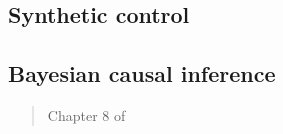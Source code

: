 \documentclass[12pt]{article}
\begin{document}
\begin{verse}  \end{verse}

\begin{verse}  \end{verse}

\subsection{Synthetic control}

\begin{verse}  \end{verse}

\begin{verse}  \end{verse}

\begin{verse}  \end{verse}

\subsection{Bayesian causal inference}

\begin{verse}  \end{verse}

\begin{verse} Chapter 8 of  \end{verse}

\begin{verse}  \end{verse}

\begin{verse}  \end{verse}

\begin{verse}  \end{verse}

\clearpage


\clearpage

\end{document}
